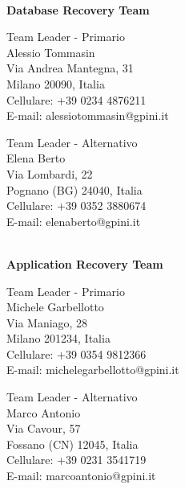\documentclass[12pt, a4paper, titlepage]{report}
\begin{document}
	\newpage
	\centerline{\textbf{\\Database Recovery Team}}
	\begin{paracol}{2}
		\setlength{\columnsep}{5em}
		\begin{leftcolumn}
			\begin{adjustwidth}{0.5cm}{}
				Team Leader - Primario \\
				Alessio Tommasin \\
				Via Andrea Mantegna, 31\\ 
				Milano 20090, Italia \\ 
				Cellulare:  +39 0234 4876211 \\
				E-mail:  alessiotommasin@gpini.it 
			\end{adjustwidth}
		\end{leftcolumn}
		\begin{rightcolumn}
			\begin{adjustwidth}{0.5cm}{}
				Team Leader - Alternativo \\
				Elena Berto \\
				Via Lombardi, 22\\ 
				Pognano (BG) 24040, Italia \\
				Cellulare:  +39 0352 3880674 \\
				E-mail: elenaberto@gpini.it 
			\end{adjustwidth}
		\end{rightcolumn}
	\end{paracol}
	
	\vspace{0.5cm}
	\centerline{\textbf{\\Application Recovery Team}}
	\begin{paracol}{2}
		\setlength{\columnsep}{5em}
		\begin{leftcolumn}
			\begin{adjustwidth}{0.5cm}{}
				Team Leader - Primario \\
				Michele Garbellotto \\
				Via Maniago, 28\\ 
				Milano 201234, Italia \\
				Cellulare:  +39 0354 9812366 \\
				E-mail:  michelegarbellotto@gpini.it 
			\end{adjustwidth}
		\end{leftcolumn}
		\begin{rightcolumn}
			\begin{adjustwidth}{0.5cm}{}
				Team Leader - Alternativo \\
				Marco Antonio\\
				Via Cavour, 57\\ 
				Fossano (CN) 12045, Italia \\
				Cellulare:  +39 0231 3541719 \\
				E-mail: marcoantonio@gpini.it 
			\end{adjustwidth}
		\end{rightcolumn}
	\end{paracol}
	
\end{document}
